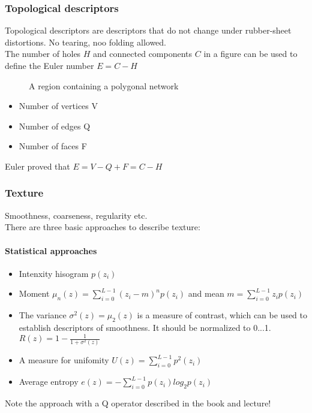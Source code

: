 \subsubsection{Topological descriptors}
Topological descriptors are descriptors that do not change under rubber-sheet distortions. No tearing, noo folding allowed.\\
The number of holes $H$ and connected components $C$ in a figure can be used to define the Euler number $E=C-H$\\

\begin{figure}[h]
	\centering
	\caption{A region containing a polygonal network}
\end{figure}

\begin{itemize}
\item Number of vertices V
\item Number of edges Q
\item Number of faces F
\end{itemize}
Euler proved that $E=V-Q+F=C-H$
\subsubsection{Texture}
Smoothness, coarseness, regularity etc.\\
There are three basic approaches to describe texture:\\
\paragraph{Statistical approaches}
\begin{itemize}
\item Intenxity hisogram $p(z_i)$
\item Moment $\mu_n(z)=\sum\limits_{i=0}^{L-1}(z_i-m)^np(z_i)$ and mean $m=\sum\limits_{i=0}^{L-1}z_ip(z_i)$
\item The variance $\sigma ^2(z) =\mu_2 (z)$ is a measure of contrast, which can be used to establish descriptors of smoothness. It should be normalized to 0...1. $R(z)=1-\frac{1}{1+\sigma ^2(z)}$
\item A measure for unifomity $U(z)=\sum\limits_{i=0}^{L-1}p^2(z_i)$
\item Average entropy $e(z)=-\sum\limits_{i=0}^{L-1}p(z_i)log_2p(z_i)$
\end{itemize}
Note the approach with a Q operator described in the book and lecture!\\

